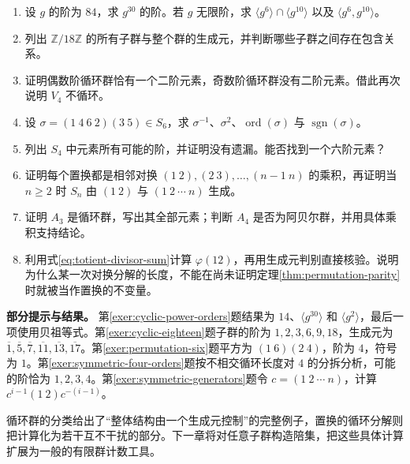 \begin{enumerate}
  \item\label{exer:cyclic-power-orders} 设 $g$ 的阶为 $84$，求 $g^{30}$ 的阶。若 $g$ 无限阶，求 $\langle g^6\rangle\cap\langle g^{10}\rangle$ 以及 $\langle g^6,g^{10}\rangle$。
  \item\label{exer:cyclic-eighteen} 列出 $\mathbb Z/18\mathbb Z$ 的所有子群与整个群的生成元，并判断哪些子群之间存在包含关系。
  \item\label{exer:cyclic-involution} 证明偶数阶循环群恰有一个二阶元素，奇数阶循环群没有二阶元素。借此再次说明 $V_4$ 不循环。
  \item\label{exer:permutation-six} 设 $\sigma=(1\ 4\ 6\ 2)(3\ 5)\in S_6$，求 $\sigma^{-1}$、$\sigma^2$、$\operatorname{ord}(\sigma)$ 与 $\operatorname{sgn}(\sigma)$。
  \item\label{exer:symmetric-four-orders} 列出 $S_4$ 中元素所有可能的阶，并证明没有遗漏。能否找到一个六阶元素？
  \item\label{exer:symmetric-generators} 证明每个置换都是相邻对换 $(1\ 2),(2\ 3),\ldots,(n-1\ n)$ 的乘积，再证明当 $n\geq2$ 时 $S_n$ 由 $(1\ 2)$ 与 $(1\ 2\ \cdots\ n)$ 生成。
  \item\label{exer:small-alternating-groups} 证明 $A_3$ 是循环群，写出其全部元素；判断 $A_4$ 是否为阿贝尔群，并用具体乘积支持结论。
  \item\label{exer:totient-and-parity} 利用式\eqref{eq:totient-divisor-sum}计算 $\varphi(12)$，再用生成元判别直接核验。说明为什么某一次对换分解的长度，不能在尚未证明定理\ref{thm:permutation-parity}时就被当作置换的不变量。
\end{enumerate}

\textbf{部分提示与结果。} 第\ref{exer:cyclic-power-orders}题结果为 $14$、$\langle g^{30}\rangle$ 和 $\langle g^2\rangle$，最后一项使用贝祖等式。第\ref{exer:cyclic-eighteen}题子群的阶为 $1,2,3,6,9,18$，生成元为 $\overline1,\overline5,\overline7,\overline{11},\overline{13},\overline{17}$。第\ref{exer:permutation-six}题平方为 $(1\ 6)(2\ 4)$，阶为 $4$，符号为 $1$。第\ref{exer:symmetric-four-orders}题按不相交循环长度对 $4$ 的分拆分析，可能的阶恰为 $1,2,3,4$。第\ref{exer:symmetric-generators}题令 $c=(1\ 2\ \cdots\ n)$，计算 $c^{i-1}(1\ 2)c^{-(i-1)}$。

循环群的分类给出了“整体结构由一个生成元控制”的完整例子，置换的循环分解则把计算化为若干互不干扰的部分。下一章将对任意子群构造陪集，把这些具体计算扩展为一般的有限群计数工具。

